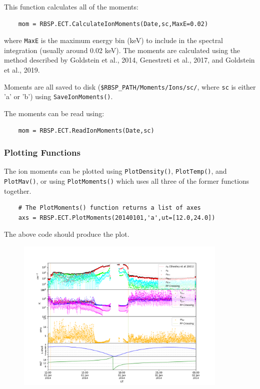 	This function calculates all of the moments:
	
	\begin{verbatim}
	mom = RBSP.ECT.CalculateIonMoments(Date,sc,MaxE=0.02)
	\end{verbatim}
	
	where \texttt{MaxE} is the maximum energy bin (keV) to include in the spectral integration (usually around 0.02 keV). The moments are calculated using the method described by Goldstein et al., 2014, Genestreti et al., 2017, and Goldstein et al., 2019.
	
	Moments are all saved to disk (\texttt{\$RBSP\_PATH/Moments/Ions/sc/}, where \texttt{sc} is either 'a' or 'b') using \texttt{SaveIonMoments()}.
	
	The moments can be read using:
	
	\begin{verbatim}
	mom = RBSP.ECT.ReadIonMoments(Date,sc)
	\end{verbatim}
	
	\subsubsection{Plotting Functions}
	
	The ion moments can be plotted using \texttt{PlotDensity()}, \texttt{PlotTemp()}, and \texttt{PlotMav()}, or using \texttt{PlotMoments()} which uses all three of the former functions together.
	
	\begin{verbatim}
	# The PlotMoments() function returns a list of axes
	axs = RBSP.ECT.PlotMoments(20140101,'a',ut=[12.0,24.0])
	\end{verbatim}
	
	The above code should produce the plot.
	\begin{figure}
		\includegraphics[width=0.9\textwidth]{figures/ch4_rbspions.png}
	\end{figure}
	
